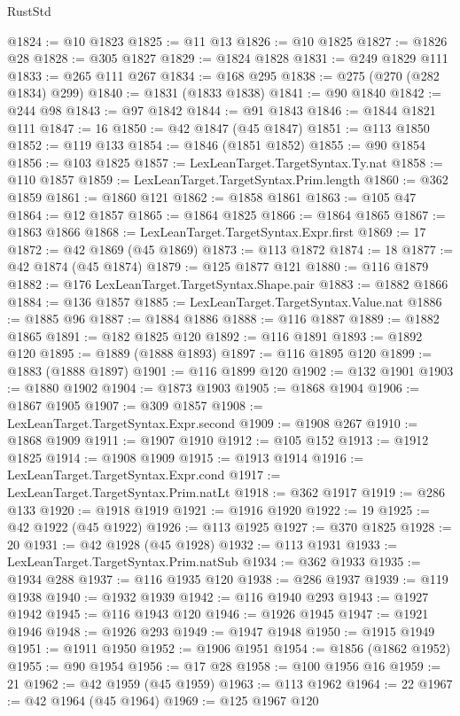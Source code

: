 \begin{lexlean}{RustStd}
\begin{coremodule}
@1824 := @10 @1823
@1825 := @11 @13
@1826 := @10 @1825
@1827 := @1826 @28
@1828 := @305 @1827
@1829 := @1824 @1828
@1831 := @249 @1829 @111
@1833 := @265 @111 @267
@1834 := @168 @295
@1838 := @275 (@270 (@282 @1834) @299)
@1840 := @1831 (@1833 @1838)
@1841 := @90 @1840
@1842 := @244 @98
@1843 := @97 @1842
@1844 := @91 @1843
@1846 := @1844 @1821 @111
@1847 := 16
@1850 := @42 @1847 (@45 @1847)
@1851 := @113 @1850
@1852 := @119 @133
@1854 := @1846 (@1851 @1852)
@1855 := @90 @1854
@1856 := @103 @1825
@1857 := LexLeanTarget.TargetSyntax.Ty.nat
@1858 := @110 @1857
@1859 := LexLeanTarget.TargetSyntax.Prim.length
@1860 := @362 @1859
@1861 := @1860 @121
@1862 := @1858 @1861
@1863 := @105 @47
@1864 := @12 @1857
@1865 := @1864 @1825
@1866 := @1864 @1865
@1867 := @1863 @1866
@1868 := LexLeanTarget.TargetSyntax.Expr.first
@1869 := 17
@1872 := @42 @1869 (@45 @1869)
@1873 := @113 @1872
@1874 := 18
@1877 := @42 @1874 (@45 @1874)
@1879 := @125 @1877 @121
@1880 := @116 @1879
@1882 := @176 LexLeanTarget.TargetSyntax.Shape.pair
@1883 := @1882 @1866
@1884 := @136 @1857
@1885 := LexLeanTarget.TargetSyntax.Value.nat
@1886 := @1885 @96
@1887 := @1884 @1886
@1888 := @116 @1887
@1889 := @1882 @1865
@1891 := @182 @1825 @120
@1892 := @116 @1891
@1893 := @1892 @120
@1895 := @1889 (@1888 @1893)
@1897 := @116 @1895 @120
@1899 := @1883 (@1888 @1897)
@1901 := @116 @1899 @120
@1902 := @132 @1901
@1903 := @1880 @1902
@1904 := @1873 @1903
@1905 := @1868 @1904
@1906 := @1867 @1905
@1907 := @309 @1857
@1908 := LexLeanTarget.TargetSyntax.Expr.second
@1909 := @1908 @267
@1910 := @1868 @1909
@1911 := @1907 @1910
@1912 := @105 @152
@1913 := @1912 @1825
@1914 := @1908 @1909
@1915 := @1913 @1914
@1916 := LexLeanTarget.TargetSyntax.Expr.cond
@1917 := LexLeanTarget.TargetSyntax.Prim.natLt
@1918 := @362 @1917
@1919 := @286 @133
@1920 := @1918 @1919
@1921 := @1916 @1920
@1922 := 19
@1925 := @42 @1922 (@45 @1922)
@1926 := @113 @1925
@1927 := @370 @1825
@1928 := 20
@1931 := @42 @1928 (@45 @1928)
@1932 := @113 @1931
@1933 := LexLeanTarget.TargetSyntax.Prim.natSub
@1934 := @362 @1933
@1935 := @1934 @288
@1937 := @116 @1935 @120
@1938 := @286 @1937
@1939 := @119 @1938
@1940 := @1932 @1939
@1942 := @116 @1940 @293
@1943 := @1927 @1942
@1945 := @116 @1943 @120
@1946 := @1926 @1945
@1947 := @1921 @1946
@1948 := @1926 @293
@1949 := @1947 @1948
@1950 := @1915 @1949
@1951 := @1911 @1950
@1952 := @1906 @1951
@1954 := @1856 (@1862 @1952)
@1955 := @90 @1954
@1956 := @17 @28
@1958 := @100 @1956 @16
@1959 := 21
@1962 := @42 @1959 (@45 @1959)
@1963 := @113 @1962
@1964 := 22
@1967 := @42 @1964 (@45 @1964)
@1969 := @125 @1967 @120

\end{coremodule}
\end{lexlean}
